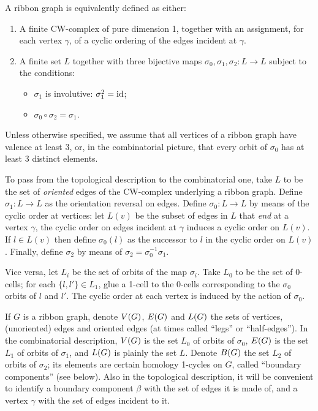 \begin{definition}
  \label{dfn:ribbon-graphs}
  A ribbon graph is equivalently defined as either:
  \begin{enumerate}
  \item\label{item:rg1} A finite CW-complex of pure dimension 1,
    together with an assignment, for each vertex $\gamma$, of a cyclic
    ordering of the edges incident at $\gamma$.
  \item\label{item:rg2} A finite set $L$ together with three bijective
    maps $\sigma_0, \sigma_1, \sigma_2 : L \to L$ subject to the conditions:
    \begin{itemize}
    \item $\sigma_1$ is involutive: $\sigma_1^2 = \operatorname{id}$;
    \item $\sigma_0 \circ \sigma_2 = \sigma_1$.
    \end{itemize}
  \end{enumerate}
  Unless otherwise specified, we assume that all vertices of a ribbon
  graph have valence at least 3, or, in the combinatorial picture,
  that every orbit of $\sigma_0$ has at least 3 distinct elements.
\end{definition}

To pass from the topological description to the combinatorial one,
take $L$ to be the set of \emph{oriented} edges of the CW-complex
underlying a ribbon graph.  Define $\sigma_1:L\to L$ as the orientation
reversal on edges.  Define $\sigma_0:L\to L$ by means of the cyclic order at
vertices: let $L(v)$ be the subset of edges in $L$ that \emph{end} at
a vertex $\gamma$, the cyclic order on edges incident at $\gamma$ induces a
cyclic order on $L(v)$.  If $l\in L(v)$ then define $\sigma_0(l)$ as the
successor to $l$ in the cyclic order on $L(v)$.  Finally, define $\sigma_2$
by means of $\sigma_2=\sigma_0^{-1}\sigma_1$.

Vice versa, let $L_i$ be the set of orbits of the map $\sigma_i$.  Take
$L_0$ to be the set of 0-cells; for each $\{l,l'\} \in L_1$, glue a
1-cell to the 0-cells corresponding to the $\sigma_0$ orbits of $l$ and
$l'$.  The cyclic order at each vertex is induced by the action of
$\sigma_0$.

If $G$ is a ribbon graph, denote $V(G)$, $E(G)$ and
$L(G)$ the sets of vertices, (unoriented) edges and oriented edges
(at times called ``legs'' or ``half-edges'').  In the combinatorial
description, $V(G)$ is the set $L_0$ of orbits of $\sigma_0$,
$E(G)$ is the set $L_1$ of orbits of $\sigma_1$, and $L(G)$ is
plainly the set $L$.  Denote $B(G)$ the set $L_2$ of orbits of
$\sigma_2$; its elements are certain homology 1-cycles on $G$, called
``boundary components'' (see below).  Also in the topological
description, it will be convenient to identify a boundary component
$\beta$ with the set of edges it is made of, and a vertex $\gamma$ with the set
of edges incident to it.


